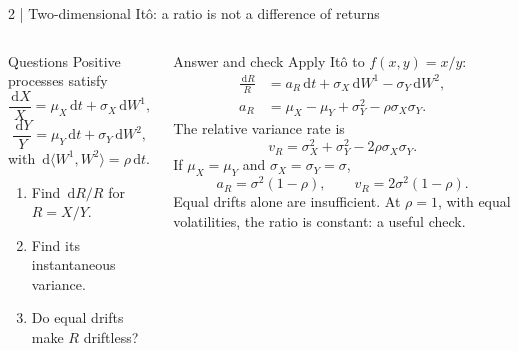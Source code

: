 \documentclass[handout,10pt,t,aspectratio=169]{beamer}
\newcommand{\dd}{\,\mathrm d}
\newenvironment{questions}{\begin{block}{Questions}}{\end{block}}
\newenvironment{answers}{\begin{exampleblock}{Answer and check}}{\end{exampleblock}}
\newcommand{\compact}{\small%
 \setlength{\abovedisplayskip}{3pt}%
 \setlength{\belowdisplayskip}{3pt}%
 \setlength{\abovedisplayshortskip}{2pt}%
 \setlength{\belowdisplayshortskip}{2pt}%
 \setlength{\parskip}{2pt}}
\begin{document}
\begin{frame}{2 | Two-dimensional It\^o: a ratio is not a difference of returns}
\compact
\begin{columns}[T,onlytextwidth]
\begin{questions}
Positive processes satisfy
\[
 \frac{\dd X}{X}=\mu_X\dd t+\sigma_X\dd W^1,
\]
\[
 \frac{\dd Y}{Y}=\mu_Y\dd t+\sigma_Y\dd W^2,
\]
with \(\dd\langle W^1,W^2\rangle=\rho\dd t\).
\begin{enumerate}
\item Find \(\dd R/R\) for \(R=X/Y\).
\item Find its instantaneous variance.
\item Do equal drifts make \(R\) driftless?
\end{enumerate}
\end{questions}
\begin{answers}
Apply It\^o to \(f(x,y)=x/y\):
\[
 \begin{aligned}
 \frac{\dd R}{R}
 &=a_R\dd t+\sigma_X\dd W^1-\sigma_Y\dd W^2,\\
 a_R&=\mu_X-\mu_Y+\sigma_Y^2
       -\rho\sigma_X\sigma_Y.
 \end{aligned}
\]
The relative variance rate is
\[
 v_R=\sigma_X^2+\sigma_Y^2-2\rho\sigma_X\sigma_Y.
\]
If \(\mu_X=\mu_Y\) and \(\sigma_X=\sigma_Y=\sigma\),
\[
 a_R=\sigma^2(1-\rho),\qquad
 v_R=2\sigma^2(1-\rho).
\]
Equal drifts alone are insufficient. At \(\rho=1\), with equal volatilities,
the ratio is constant: a useful check.
\end{answers}
\end{columns}
\end{frame}
\end{document}
